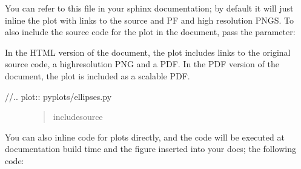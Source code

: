 \documentclass[letterpaper,10pt,english]{sphinxmanual}
\begin{document}
\begin{sphinxVerbatim}[commandchars=\\\{\}]
  
   
\end{sphinxVerbatim}

\sphinxAtStartPar
You can refer to this file in your sphinx documentation; by default it
will just inline the plot with links to the source and PF and high
resolution PNGS.  To also include the source code for the plot in the
document, pass the  parameter:

\begin{sphinxVerbatim}[commandchars=\\\{\}]
  
\end{sphinxVerbatim}

\sphinxAtStartPar
In the HTML version of the document, the plot includes links to the
original source code, a high\sphinxhyphen{}resolution PNG and a PDF.  In the PDF
version of the document, the plot is included as a scalable PDF.
\begin{description}
\item[{//.. plot:: pyplots/ellipses.py}] \leavevmode\begin{quote}\begin{description}
\item[{include\sphinxhyphen{}source}] \leavevmode
\end{description}\end{quote}

\end{description}

\sphinxAtStartPar
You can also inline code for plots directly, and the code will be
executed at documentation build time and the figure inserted into your
docs; the following code:
\end{document}
